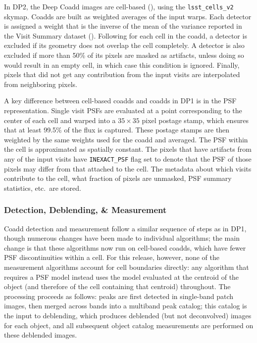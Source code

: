 In \gls{DP2}, the Deep Coadd images are cell-based (), using the \texttt{lsst\_cells\_v2} skymap.
Coadds are built as weighted averages of the input warps.
Each detector is assigned a weight that is the inverse of the mean of the variance reported in the \gls{Visit} Summary dataset ().
Following \cite[][]{2024arXiv240701771A} for each cell in the coadd, a detector is excluded if its geometry does not overlap the cell completely.
A detector is also excluded if more than 50\% of its pixels are masked as artifacts, unless doing so would result in an empty cell, in which case this condition is ignored. %
Finally, pixels that did not get any contribution from the input visits are interpolated from neighboring pixels.

A key difference between cell-based coadds and coadds in \gls{DP1} is in the \gls{PSF} representation.
Single visit PSFs are evaluated at a point corresponding to the center of each cell and warped into a $35 \times 35$ pixel \gls{postage stamp}, which ensures that at least 99.5\% of the \gls{flux} is captured.
These postage stamps are then weighted by the same weights used for the coadd and averaged.
The \gls{PSF} within the cell is approximated as spatially constant.
The pixels that have artifacts from any of the input visits have \texttt{INEXACT\_PSF} flag set to denote that the \gls{PSF} of those pixels may differ from that attached to the cell.
The \gls{metadata} about which visits contribute to the cell, what fraction of pixels are unmasked, \gls{PSF} summary statistics, etc.\ are stored.

\subsubsection{Detection, Deblending, \& Measurement} \label{sec:drp-multivisit-detection}

Coadd detection and measurement follow a similar sequence of steps as in \gls{DP1}, though numerous changes have been made to individual algorithms; the main change is that these algorithms now run on cell-based coadds, which have fewer \gls{PSF} discontinuities within a cell.
For this release, however, none of the measurement algorithms account for cell boundaries directly: any \gls{algorithm} that requires a \gls{PSF} model instead uses the model evaluated at the centroid of the object (and therefore of the cell containing that centroid) throughout.
The processing proceeds as follows: peaks are first detected in single-band \gls{patch} images, then merged across bands into a multiband peak catalog; this catalog is the input to deblending, which produces deblended (but not deconvolved) images for each object, and all subsequent object catalog measurements are performed on these deblended images.

